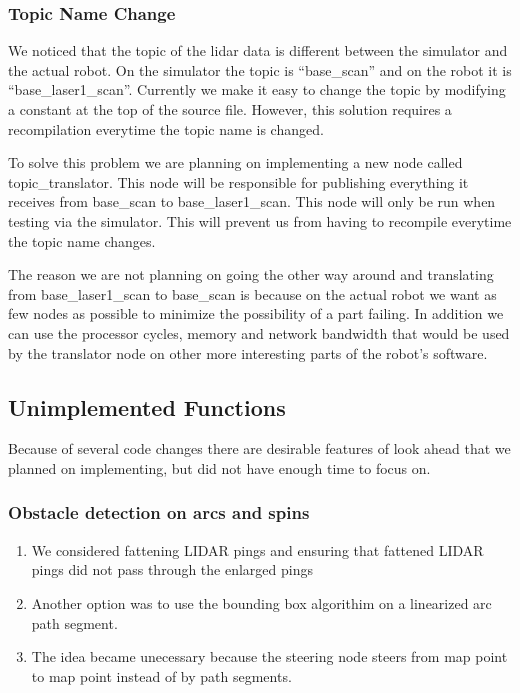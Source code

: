 \subsubsection{Topic Name Change}
We noticed that the topic of the lidar data is different between the
simulator and the actual robot.  On the simulator the topic is
``base\_scan'' and on the robot it is ``base\_laser1\_scan''.  Currently
we make it easy to change the topic by modifying a constant at the top
of the source file.  However, this solution requires a recompilation
everytime the topic name is changed.

To solve this problem we are planning on implementing a new node
called topic\_translator.  This node will be responsible for
publishing everything it receives from base\_scan to
base\_laser1\_scan.  This node will only be run when testing via the
simulator.  This will prevent us from having to recompile everytime
the topic name changes.

The reason we are not planning on going the other way around and
translating from base\_laser1\_scan to base\_scan is because on the
actual robot we want as few nodes as possible to minimize the
possibility of a part failing.  In addition we can use the processor
cycles, memory and network bandwidth that would be used by the translator node on
other more interesting parts of the robot's software.

\subsection{Unimplemented Functions}
Because of several code changes there are desirable features of look ahead that we planned on implementing, but did
not have enough time to focus on.


\subsubsection{Obstacle detection on arcs and spins}
 \begin{enumerate}
   \item We considered fattening LIDAR pings and ensuring that fattened LIDAR pings did not pass through the enlarged pings
 
   \item Another option was to use the bounding box algorithim on a linearized arc path segment.
   \item  The idea became unecessary because the steering node steers from map point to map point instead of by path segments.
  \end{enumerate}







